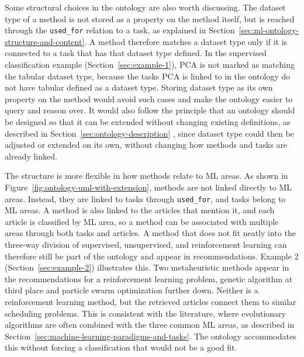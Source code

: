 Some structural choices in the ontology are also worth discussing. 
The dataset type of a method is not stored as a property on the 
method itself, but is reached through the \texttt{used\_for} relation 
to a task, as explained in 
Section~\ref{sec:ml-ontology-structure-and-content}.
A method therefore matches a dataset type only if it is connected to a task 
that has that dataset type defined. In the 
supervised classification example (Section~\ref{sec:example-1}), 
PCA is not marked as matching the tabular 
dataset type, because the tasks PCA is linked to in the ontology do 
not have tabular defined as a dataset type. Storing dataset type as 
its own property on the method would avoid such cases and make the 
ontology easier to query and reason over. It would also follow the 
principle that an ontology should be designed so that it can be 
extended without changing existing definitions, as described in 
Section~\ref{sec:ontology-description} 
\parencite{gruber1995toward_principles_design_ontologies_used_knowledge_sharing}, 
since dataset type could then be adjusted or extended on its own, 
without changing how methods and tasks are already linked.

The structure is more flexible in how methods relate to ML 
areas. As shown in 
Figure~\ref{fig:ontology-uml-with-extension}, methods are not 
linked directly to ML areas. Instead, they are linked to tasks 
through \texttt{used\_for}, and tasks belong to ML areas. A 
method is also linked to the articles that mention it, and 
each article is classified by ML area, so a method can be 
associated with multiple areas through both tasks and 
articles. A method that does not fit neatly into the three-way 
division of supervised, unsupervised, and reinforcement 
learning can therefore still be part of the ontology and 
appear in recommendations. Example 2 
(Section~\ref{sec:example-2}) illustrates this. Two 
metaheuristic methods appear in the recommendations for a 
reinforcement learning problem, genetic algorithm at third 
place and particle swarm optimization further down. Neither 
is a reinforcement learning method, but the retrieved 
articles connect them to similar scheduling problems. This is 
consistent with the literature, where evolutionary algorithms 
are often combined with the three common ML areas, as described in 
Section~\ref{sec:machine-learning-paradigms-and-tasks}. The 
ontology accommodates this without forcing a classification 
that would not be a good fit.

